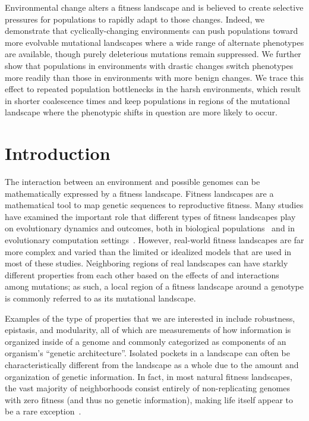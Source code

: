\documentclass[10pt,letterpaper]{article}
\begin{document}
Environmental change alters a fitness landscape and is believed to create selective pressures for populations to rapidly adapt to those changes.  Indeed, we demonstrate that cyclically-changing environments can push populations toward more evolvable mutational landscapes where a wide range of alternate phenotypes are available, though purely deleterious mutations remain suppressed. We further show that populations in environments with drastic changes switch phenotypes more readily than those in environments with more benign changes. We trace this effect to repeated population bottlenecks in the harsh environments, which result in shorter coalescence times and keep populations in regions of the mutational landscape where the phenotypic shifts in question are more likely to occur.

\linenumbers

\section*{Introduction}
The interaction between an environment and possible genomes can be mathematically expressed by a fitness landscape.
Fitness landscapes are a mathematical tool to map genetic sequences to reproductive fitness. Many studies have examined the important role that different types of fitness landscapes play on evolutionary dynamics and outcomes, both in biological populations~\cite{khan_negative_2011,szendro_quantitative_2013,weinreich_darwinian_2006,nahum_tortoisehare_2015} and in evolutionary computation settings~\cite{merz_fitness_2000,humeau_paradiseo-mo:_2013,kallel_theoretical_2013}. However, real-world fitness landscapes are far more complex and varied than the limited or idealized models that are used in most of these studies. Neighboring regions of real landscapes can have starkly different properties from each other based on the effects of and interactions among mutations; as such, a local region of a fitness landscape around a genotype is commonly referred to as its mutational landscape.%

Examples of the type of properties that we are interested in include robustness, epistasis, and modularity, all of which are measurements of how information is organized inside of a genome and commonly categorized as components of an organism's ``genetic architecture''. Isolated pockets in a landscape can often be characteristically different from the landscape as a whole due to the amount and organization of genetic information. In fact, in most natural fitness landscapes, the vast majority of neighborhoods consist entirely of non-replicating genomes with zero fitness (and thus no genetic information), making life itself appear to be a rare exception~\cite{gavrilets_fitness_2004}.
\end{document}
